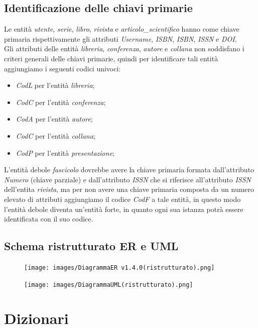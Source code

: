 \documentclass{article}
\begin{document}
\subsection{Identificazione delle chiavi primarie}
Le entità \textit{utente}, \textit{serie}, \textit{libro}, \textit{rivista} e \textit{articolo\_scientifico} hanno come chiave primaria rispettivamente gli attributi \textit{Username}, \textit{ISBN}, \textit{ISBN}, \textit{ISSN} e \textit{DOI}.\\
Gli attributi delle entità \textit{libreria}, \textit{conferenza}, \textit{autore} e \textit{collana} non soddisfano i criteri generali delle chiavi primarie, quindi per identificare tali entità aggiungiamo i seguenti codici univoci:
\begin{itemize} 
\item \textit{CodL} per l'entità \textit{libreria}; 
\item \textit{CodC} per l'entità \textit{conferenza}; 
\item \textit{CodA} per l'entità \textit{autore}; 
\item \textit{CodC} per l'entità \textit{collana};
\item \textit{CodP} per l'entità \textit{presentazione}; 
\end{itemize}
L'entità debole \textit{fascicolo} dovrebbe avere la chiave primaria formata dall'attributo \textit{Numero} (chiave parziale) e dall'attributo \textit{ISSN} che si riferisce all'attributo \textit{ISSN} dell'entita \textit{rivista}, ma per non avere una chiave primaria composta da un numero elevato di attributi aggiungiamo il codice \textit{CodF} a tale entità, in questo modo l'entità debole diventa un'entità forte, in quanto ogni sua istanza potrà essere identificata con il suo codice.

\newpage
\subsection{Schema ristrutturato ER e UML}

\begin{figure}[htp!]
    \texttt{[image: images/DiagrammaER v1.4.0(ristrutturato).png]}
\end{figure}
\begin{figure}[htp!]
    \texttt{[image: images/DiagrammaUML(ristrutturato).png]}
\end{figure}

\newpage
\section{Dizionari}
\end{document}
